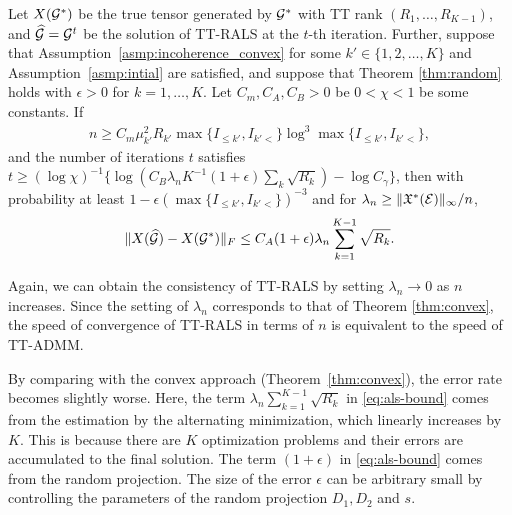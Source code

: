 \begin{theorem} \label{thm:als} Let $X(\mathcal{G}^*)$ be the true tensor
  generated by $\mathcal{G}^*$ with TT rank $(R_1,\dots,R_{K-1})$, and
  $\widehat{\mathcal{G}} = \mathcal{G}^t$ be the solution of TT-RALS at the $t$-th 
  iteration.  Further, suppose that Assumption~\ref{asmp:incoherence_convex} for some $k' \in \{1,2,\ldots,K\}$ and
  Assumption~\ref{asmp:intial} are satisfied, and suppose that Theorem \eqref{thm:random} holds with $\epsilon > 0$ for $k=1,\dots,K$.  Let $C_m,C_A,C_B > 0$ be $0 < \chi < 1$ be some
  constants.  If
    \begin{align*}
        n \geq C_{m} \mu_{k'}^2 R_{k'} \max\{I_{\leq k'}, I_{k'<}\} \log^3  \max\{I_{\leq k'}, I_{k'<}\},
    \end{align*}
    and the number of iterations $t$ satisfies
        $t \geq (\log \chi)^{-1}\{\log ( C_B  \lambda_n K^{-1}(1+\epsilon)\sum_{k} \sqrt{R_{k}} ) - \log C_{\gamma} \}$,
     then with probability at least $1-\epsilon( \max\{I_{\leq k'}, I_{k'<}\})^{-3}$ and for $\lambda_n \geq \|\mathfrak{X}^*(\mathcal{E})\|_{\infty}/n$,
    \begin{align}\label{eq:als-bound}
        \|X(\widehat{\mathcal{G}}) - X(\mathcal{G}^*)\|_F \leq C_A  (1+\epsilon) \lambda_n \sum_{k=1}^{K-1} \sqrt{R_{k}}.
    \end{align}
\end{theorem}

Again, we can obtain the consistency of TT-RALS by setting
$\lambda_n \to 0$ as $n$ increases.  Since the setting of $\lambda_n$
corresponds to that of Theorem \ref{thm:convex}, the speed of
convergence of TT-RALS in terms of $n$ is equivalent to the speed of
TT-ADMM.

By comparing with the convex approach (Theorem~\ref{thm:convex}), the
error rate becomes slightly worse.  Here, the term
$\lambda_n \sum_{k=1}^{K-1} \sqrt{R_{k}}$ in \eqref{eq:als-bound}
comes from the estimation by the alternating minimization, which
linearly increases by $K$.  This is because there are $K$ optimization
problems and their errors are accumulated to the final solution.
%
The term $(1+\epsilon)$ in \eqref{eq:als-bound} comes from the random
projection.  The size of the error $\epsilon$ can be arbitrary small
by controlling the parameters of the random projection $D_1,D_2$ and
$s$. 
%






